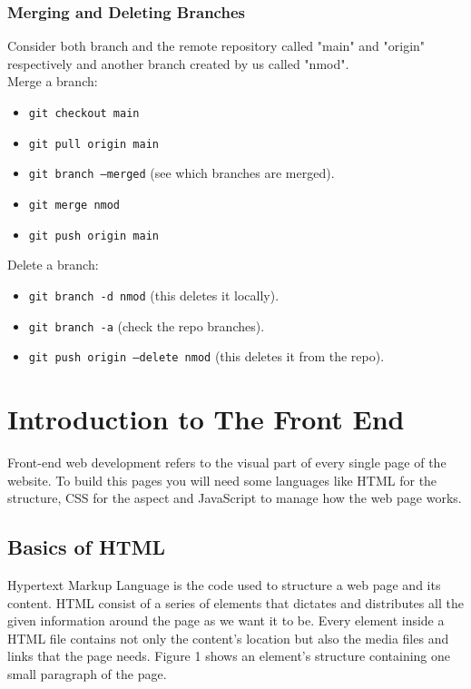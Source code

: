 \documentclass{article}
\begin{document}
    \subsubsection{Merging and Deleting Branches}
    
    Consider both branch and the remote repository called "main" and "origin" respectively and another branch created by us called "nmod".\vspace{0.5cm}\\
    
    Merge a branch:
    \begin{itemize}
    	\item {\tt git checkout main}
    	\item {\tt git pull origin main}
    	\item {\tt git branch --merged} (see which branches are merged).
    	\item {\tt git merge nmod}
    	\item {\tt git push origin main}
    \end{itemize}

    Delete a branch:
    \begin{itemize}
	    \item {\tt git branch -d nmod} (this deletes it locally).
	    \item {\tt git branch -a} (check the repo branches).
	    \item {\tt git push origin --delete nmod} (this deletes it from the repo).
    \end{itemize}

    \section{Introduction to The Front End}
    
    Front-end web development refers to the visual part of every single page of the website. To build this pages you will need some languages like HTML for the structure, CSS for the aspect and JavaScript to manage how the web page works.
    
    \subsection{Basics of HTML}
    
    Hypertext Markup Language is the code used to structure a web page and its content. HTML consist of a series of elements that dictates and distributes all the given information around the page as we want it to be. Every element inside a HTML file contains not only the content's location but also the media files and links that the page needs. Figure 1 shows an element's structure containing one small paragraph of the page.
    
\end{document}

